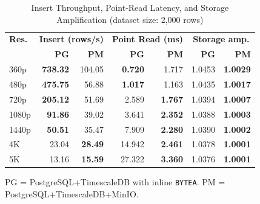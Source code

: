 \documentclass[conference]{IEEEtran}
\begin{document}
\begin{table}[htbp]
\centering
\renewcommand{\arraystretch}{1.1}
\caption{Insert Throughput, Point-Read Latency, and Storage Amplification (dataset size: 2,000 rows)}
\label{tab:performance_summary}
\begin{tabular}{l rr rr rr}
\hline
\textbf{Res.} & \multicolumn{2}{c}{\textbf{Insert (rows/s)}} & \multicolumn{2}{c}{\textbf{Point Read (ms)}} & \multicolumn{2}{c}{\textbf{Storage amp.}} \\
 & \textbf{PG} & \textbf{PM} & \textbf{PG} & \textbf{PM} & \textbf{PG} & \textbf{PM} \\
\hline
360p  & \textbf{738.32} & 104.05 & \textbf{0.720} & 1.717 & 1.0453 & \textbf{1.0029} \\
480p  & \textbf{475.75} & 56.88 & \textbf{1.017} & 1.163 & 1.0435 & \textbf{1.0017} \\
720p  & \textbf{205.12} & 51.69 & 2.589 & \textbf{1.767} & 1.0394 & \textbf{1.0007} \\
1080p & \textbf{91.86} & 39.02 & 3.641 & \textbf{2.352} & 1.0388 & \textbf{1.0003} \\
1440p & \textbf{50.51} & 35.47 & 7.909 & \textbf{2.280} & 1.0390 & \textbf{1.0002} \\
4K    & 23.04 & \textbf{28.49} & 14.942 & \textbf{2.461} & 1.0378 & \textbf{1.0001} \\
5K    & 13.16 & \textbf{15.59} & 27.322 & \textbf{3.360} & 1.0376 & \textbf{1.0001} \\
\hline
\end{tabular}

\footnotesize PG = PostgreSQL+TimescaleDB with inline \texttt{BYTEA}. PM = PostgreSQL+TimescaleDB+MinIO.
\end{table}
\end{document}
